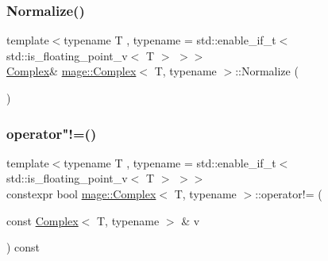 \mbox{\label{structmage_1_1_complex_adb3fdb77b1e34fb435fe9d9d1bd3cf8b}} 
\subsubsection{\texorpdfstring{Normalize()}{Normalize()}}
{\footnotesize\ttfamily template$<$typename T , typename  = std\+::enable\+\_\+if\+\_\+t$<$ std\+::is\+\_\+floating\+\_\+point\+\_\+v$<$ T $>$ $>$$>$ \\
\mbox{\hyperlink{structmage_1_1_complex}{Complex}}\& \mbox{\hyperlink{structmage_1_1_complex}{mage\+::\+Complex}}$<$ T, typename $>$\+::Normalize (\begin{DoxyParamCaption}{ }\end{DoxyParamCaption})\hspace{0.3cm}{\ttfamily [noexcept]}}

\mbox{\label{structmage_1_1_complex_a109bf5856aaadf9eacfe32e1e76db50d}} 
\subsubsection{\texorpdfstring{operator"!=()}{operator!=()}}
{\footnotesize\ttfamily template$<$typename T , typename  = std\+::enable\+\_\+if\+\_\+t$<$ std\+::is\+\_\+floating\+\_\+point\+\_\+v$<$ T $>$ $>$$>$ \\
constexpr bool \mbox{\hyperlink{structmage_1_1_complex}{mage\+::\+Complex}}$<$ T, typename $>$\+::operator!= (\begin{DoxyParamCaption}\item[{const \mbox{\hyperlink{structmage_1_1_complex}{Complex}}$<$ T, typename $>$ \&}]{v }\end{DoxyParamCaption}) const}

\mbox{\label{structmage_1_1_complex_ace045f385ad18786576a556d63f4a64d}} 
